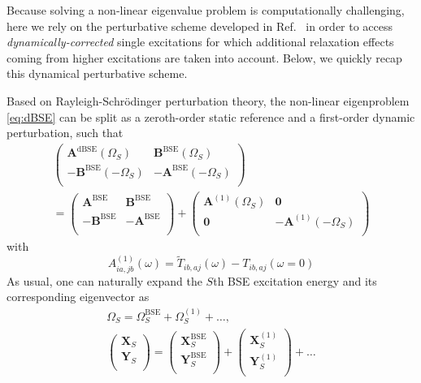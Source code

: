 \documentclass[aip,jcp,reprint,noshowkeys,superscriptaddress]{revtex4-1}
\newcommand{\BSE}{\text{BSE}}
\newcommand{\dBSE}{\text{dBSE}}
\newcommand{\Om}[2]{\Omega_{#1}^{#2}}
\newcommand{\bO}{\mathbf{0}}
\newcommand{\bA}[2]{\mathbf{A}_{#1}^{#2}}
\newcommand{\bB}[2]{\mathbf{B}_{#1}^{#2}}
\newcommand{\bX}[2]{\mathbf{X}_{#1}^{#2}}
\newcommand{\bY}[2]{\mathbf{Y}_{#1}^{#2}}
\begin{document}
Because solving a non-linear eigenvalue problem is computationally challenging, here we rely on the perturbative scheme developed in Ref.~ in order to access \textit{dynamically-corrected} single excitations for which additional relaxation effects coming from higher excitations are taken into account.
\cite{Rohlfing_2000,Romaniello_2009b,Ma_2009a,Ma_2009b,Zhang_2013,Rebolini_2016,Olevano_2019,Loos_2020h,Authier_2020,Monino_2021}
Below, we quickly recap this dynamical perturbative scheme.

Based on Rayleigh-Schr\"odinger perturbation theory, the non-linear eigenproblem \eqref{eq:dBSE} can be split as a zeroth-order static reference and a first-order dynamic perturbation, such that
\begin{multline}
\label{eq:LR-PT}
	\begin{pmatrix}
		\bA{}{\dBSE}(\Om{S}{})		&	\bB{}{\BSE}(\Om{S}{})	\\
		-\bB{}{\BSE}(-\Om{S}{})	&	-\bA{}{\BSE}(-\Om{S}{})	\\
	\end{pmatrix}
	\\
	=
	\begin{pmatrix}
		\bA{}{\BSE}	&	\bB{}{\BSE}	
		\\
		-\bB{}{\BSE}	&	-\bA{}{\BSE}	
		\\
	\end{pmatrix}
	+
	\begin{pmatrix}
		\bA{}{(1)}(\Om{S}{})		&	\bO	\\
		\bO	&	-\bA{}{(1)}(-\Om{S}{})	\\
	\end{pmatrix}
\end{multline}
with
\begin{equation}
	\label{eq:BSE-A1}
	A_{ia,jb}^{(1)}(\omega) = \widetilde{T}_{ib,aj}(\omega) - T_{ib,aj}(\omega = 0)
\end{equation}
As usual, one can naturally expand the $S$th BSE excitation energy and its corresponding eigenvector as
\begin{subequations}
\begin{gather}
	\Om{S}{} = \Om{S}{\BSE} + \Om{S}{(1)} + \ldots,
	\\
	\begin{pmatrix}
		\bX{S}{}	\\
		\bY{S}{}	\\
	\end{pmatrix}
	= 
	\begin{pmatrix}
		\bX{S}{\BSE}	\\
		\bY{S}{\BSE}	\\
	\end{pmatrix}
	+
	\begin{pmatrix}
		\bX{S}{(1)}	\\
		\bY{S}{(1)}	\\
	\end{pmatrix}
	+ \ldots
\end{gather}
\end{subequations}
\end{document}
